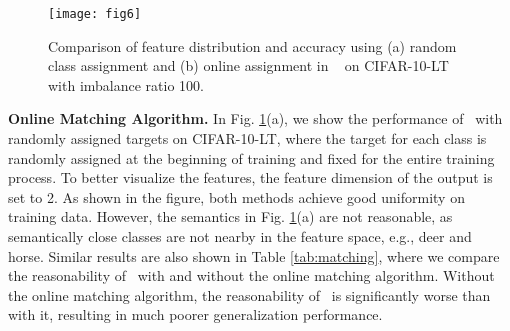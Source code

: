 \begin{figure}[h]
\begin{center}
\texttt{[image: fig6]}
\end{center}
\vspace{-10pt}
\caption{
Comparison of feature distribution and accuracy using (a) random class assignment and (b) online assignment in \name~ on CIFAR-10-LT with imbalance ratio 100.}
\label{fig:matching}
\vspace{-10pt}
\end{figure}

\begin{table}[h]
\caption{\name~with and without online matching algorithm on ImageNet-LT.}
\vspace{-5mm}
\label{tab:matching}
\begin{center}
\end{center}
\vspace{-15pt}
\end{table}

\textbf{Online Matching Algorithm.} In Fig. \ref{fig:matching}(a), we show the performance of \name~with randomly assigned targets on CIFAR-10-LT, where the target for each class is randomly assigned at the beginning of training and fixed for the entire training process. To better visualize the features, the feature dimension of the output is set to 2. As shown in the figure, both methods achieve good uniformity on training data. However, the semantics in Fig. \ref{fig:matching}(a) are not reasonable, as semantically close classes are not nearby in the feature space, e.g., deer and horse. Similar results are also shown in Table \ref{tab:matching}, where we compare the reasonability of \name~with and without the online matching algorithm. Without the online matching algorithm, the reasonability of \name~is significantly worse than with it, resulting in much poorer generalization performance.

